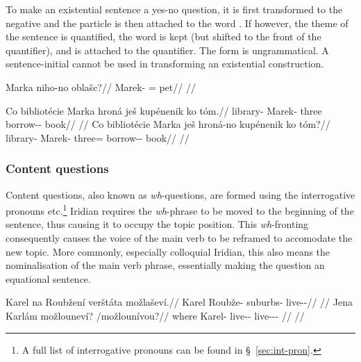 To make an existential sentence a yes-no question, it is first transformed to the negative and the particle  is then attached to the word . If however, the theme of the sentence is quantified, the word  is kept (but shifted to the front of the quantifier), and  is attached to the quantifier. The form  is ungrammatical. A sentence-initial  cannot be used in transforming an existential construction.

\pex
\begingl
\gla Marka niho-no oblašc?//
\glb Marek-\Pat{} \N{}\Exst{}=\Q{} pet//
\glft {}//
\endgl
\xe

\pex
\a
\begingl
\gla Co bibliotécie Marka hroná ješ kupénenik ko tóm.//
\glb \Abl{} library-\Gen{} Marek-\Pat{} three \Exst{} borrow-\Pv{}-\Pf{} \Lnk{} book//
\glft {}//
\endgl
\a
\begingl
\gla Co bibliotécie Marka ješ hroná-no kupénenik ko tóm?//
\glb \Abl{} library-\Gen{} Marek-\Pat{} \Exst{} three=\Q{} borrow-\Pv{}-\Pf{} \Lnk{} book//
\glft {}//
\endgl
\xe

\subsubsection{Content questions}

Content questions, also known as \emph{wh}-questions, are formed using the interrogative pronouns    etc.\footnote{
  A full list of interrogative pronouns can be found in \S~\ref{sec:int-pron}.
} Iridian requires the \emph{wh}-phrase to be moved to the beginning of the sentence, thus causing it to occupy the topic position. This \emph{wh}-fronting consequently causes the voice of the main verb to be reframed to accomodate the new topic. More commonly, especially colloquial Iridian, this also means the nominalisation of the main verb phrase, essentially making the question an equational sentence.

\pex
\a\begingl
\gla Karel na Roub\v{z}en\'i ver\v{s}t\'ata mo\v{z}la\v{s}ev\'i.//
\glb Karel \Loc{} Roub\v{z}e-\Gen{} suburbs-\Pat{} live-\Av{}-\Cont{}//
\glft {}//
\endgl
\a\begingl
\gla Jena Karl\'am mo\v{z}lounev\'i? /mo\v{z}loun\'ivou?//
\glb where Karel-\Agt{} live-\Lv{}-\Cont{} live-\Lv{}-\Cont{}-\Nz{} //
\glft {}//
\endgl
\xe


